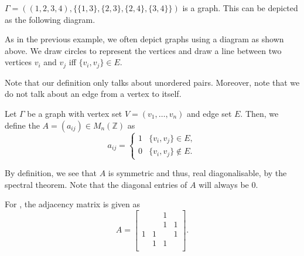 \begin{ex}
    $\Gamma = ((1, 2, 3, 4), \{\{1, 3\}, \{2, 3\}, \{2, 4\}, \{3, 4\}\})$ is a graph. This can be depicted as the following diagram.
    

    \begin{center}
        \captionsetup{type=figure}
         \label{fig:graph1}
    \end{center}
\end{ex}

\begin{rem}
    As in the previous example, we often depict graphs using a diagram as shown above. We draw circles to represent the vertices and draw a line between two vertices $v_i$ and $v_j$ iff $\{v_i, v_j\} \in E.$

    Note that our definition only talks about unordered pairs. Moreover, note that we do not talk about an edge from a vertex to itself.
\end{rem}

\begin{defn}%
    Let $\Gamma$ be a graph with vertex set $V = (v_1, \ldots, v_n)$ and edge set $E.$ Then, we define the  $A = (a_{ij}) \in M_n(\mathbb{Z})$ as
    \begin{equation*} 
        a_{ij} = \begin{cases}
            1 & \{v_i, v_j\} \in E,\\
            0 & \{v_i, v_j\} \notin E. 
        \end{cases}
    \end{equation*}
\end{defn}

\begin{rem}
    By definition, we see that $A$ is symmetric and thus, real diagonalisable, by the spectral theorem. Note that the diagonal entries of $A$ will always be $0.$
\end{rem}

\begin{ex}
    For , the adjacency matrix is given as
    \begin{equation*} 
        A = \begin{bmatrix}
             &   & 1 &   \\
             &   & 1 & 1 \\
           1 & 1 &   & 1 \\
             & 1 & 1 &   \\
        \end{bmatrix}.
    \end{equation*}
\end{ex}

